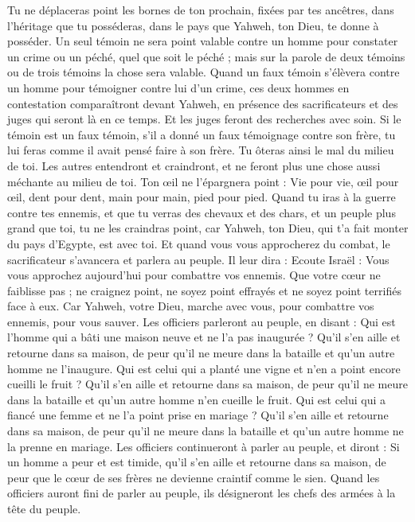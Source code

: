 \begin{multicols}{2}
Tu ne déplaceras point les bornes de ton prochain, fixées par tes ancêtres, dans l'héritage que tu posséderas, dans le pays que Yahweh, ton Dieu, te donne à posséder.
Un seul témoin ne sera point valable contre un homme pour constater un crime ou un péché, quel que soit le péché ; mais sur la parole de deux témoins ou de trois témoins la chose sera valable.
Quand un faux témoin s'élèvera contre un homme pour témoigner contre lui d’un crime,
ces deux hommes en contestation comparaîtront devant Yahweh, en présence des sacrificateurs et des juges qui seront là en ce temps.
Et les juges feront des recherches avec soin. Si le témoin est un faux témoin, s’il a donné un faux témoignage contre son frère,
tu lui feras comme il avait pensé faire à son frère. Tu ôteras ainsi le mal du milieu de toi.
Les autres entendront et craindront, et ne feront plus une chose aussi méchante au milieu de toi.
Ton œil ne l'épargnera point : Vie pour vie, œil pour œil, dent pour dent, main pour main, pied pour pied.
\VerseOne{}Quand tu iras à la guerre contre tes ennemis, et que tu verras des chevaux et des chars, et un peuple plus grand que toi, tu ne les craindras point, car Yahweh, ton Dieu, qui t'a fait monter du pays d'Egypte, est avec toi.
Et quand vous vous approcherez du combat, le sacrificateur s'avancera et parlera au peuple.
Il leur dira : Ecoute Israël : Vous vous approchez aujourd'hui pour combattre vos ennemis. Que votre cœur ne faiblisse pas ; ne craignez point, ne soyez point effrayés et ne soyez point terrifiés face à eux.
Car Yahweh, votre Dieu, marche avec vous, pour combattre vos ennemis, pour vous sauver.
Les officiers parleront au peuple, en disant : Qui est l’homme qui a bâti une maison neuve et ne l'a pas inaugurée ? Qu'il s'en aille et retourne dans sa maison, de peur qu'il ne meure dans la bataille et qu'un autre homme ne l’inaugure.
Qui est celui qui a planté une vigne et n'en a point encore cueilli le fruit ? Qu’il s'en aille et retourne dans sa maison, de peur qu'il ne meure dans la bataille et qu'un autre homme n’en cueille le fruit.
Qui est celui qui a fiancé une femme et ne l'a point prise en mariage ? Qu’il s'en aille et retourne dans sa maison, de peur qu'il ne meure dans la bataille et qu'un autre homme ne la prenne en mariage.
Les officiers continueront à parler au peuple, et diront : Si un homme a peur et est timide, qu'il s'en aille et retourne dans sa maison, de peur que le cœur de ses frères ne devienne craintif comme le sien.
Quand les officiers auront fini de parler au peuple, ils désigneront les chefs des armées à la tête du peuple.

\end{multicols}
